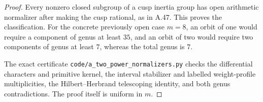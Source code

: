 \begin{proof}
Every nonzero closed subgroup of a cusp inertia
group has open arithmetic normalizer after making
the cusp rational, as in A.47. This proves the
classification. For the concrete previously open
case \(m=8\), an orbit of one would require a
component of genus at least \(35\), and an orbit
of two would require two components of genus at
least \(7\), whereas the total genus is \(7\).

The exact certificate \texttt{code/a\_two\_power\_normalizers.py} checks
the differential characters and primitive kernel,
the interval stabilizer and labelled weight-profile
multiplicities, the Hilbert--Herbrand telescoping
identity, and both genus contradictions. The proof
itself is uniform in \(m\).
\end{proof}
